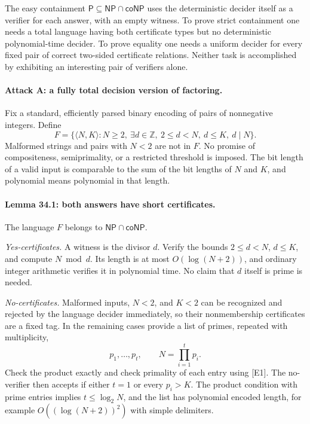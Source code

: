 \documentclass[11pt]{article}
\begin{document}
The easy containment $\mathsf P\subseteq\mathsf{NP}\cap\mathsf{coNP}$
uses the deterministic decider itself as a verifier for each answer, with
an empty witness. To prove strict containment one needs a total language
having both certificate types but no deterministic polynomial-time decider.
To prove equality one needs a uniform decider for every fixed pair of
correct two-sided certificate relations. Neither task is accomplished by
exhibiting an interesting pair of verifiers alone.

\paragraph{Attack A: a fully total decision version of factoring.}
Fix a standard, efficiently parsed binary encoding of pairs of nonnegative
integers. Define
\begin{equation}\label{a34:factorlanguage}
 F=\{\langle N,K\rangle:N\ge2,\ \exists d\in\mathbb Z,
                         \ 2\le d<N,\ d\le K,\ d\mid N\}.
\end{equation}
Malformed strings and pairs with $N<2$ are not in $F$. No promise of
compositeness, semiprimality, or a restricted threshold is imposed. The bit
length of a valid input is comparable to the sum of the bit lengths of
$N$ and $K$, and polynomial means polynomial in that length.

\paragraph{Lemma 34.1: both answers have short certificates.}
The language $F$ belongs to $\mathsf{NP}\cap\mathsf{coNP}$.

\emph{Yes-certificates.} A witness is the divisor $d$. Verify the bounds
$2\le d<N$, $d\le K$, and compute $N\bmod d$. Its length is at most
$O(\log(N+2))$, and ordinary integer arithmetic verifies it in polynomial
time. No claim that $d$ itself is prime is needed.

\emph{No-certificates.} Malformed inputs, $N<2$, and $K<2$ can be recognized
and rejected by the language decider immediately, so their nonmembership
certificates are a fixed tag. In the remaining cases provide a list of
primes, repeated with multiplicity,
\[
                       p_1,\ldots,p_t,\qquad N=\prod_{i=1}^t p_i.
\]
Check the product exactly and check primality of each entry using [E1].
The no-verifier then accepts if either $t=1$ or every $p_i>K$.
The product condition with prime entries implies $t\le\log_2 N$, and the
list has polynomial encoded length, for example $O((\log(N+2))^2)$ with
simple delimiters.
\end{document}
